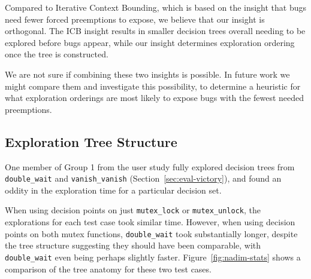 
Compared to Iterative Context Bounding\cite{chess}, which is based on the insight that bugs need fewer forced preemptions to expose, we believe that our insight is orthogonal. The ICB insight results in smaller decision trees overall needing to be explored before bugs appear, while our insight determines exploration ordering once the tree is constructed.

We are not sure if combining these two insights is possible. In future work we might compare them and investigate this possibility, to determine a heuristic for what exploration orderings are most likely to expose bugs with the fewest needed preemptions.

\subsection{Exploration Tree Structure}
\label{sec:future-nadim}

One member of Group 1 from the user study fully explored decision trees from \texttt{double\_wait} and \texttt{vanish\_vanish} (Section~\ref{sec:eval-victory}), and found an oddity in the exploration time for a particular decision set.

When using decision points on just \texttt{mutex\_lock} or \texttt{mutex\_unlock}, the explorations for each test case took similar time. However, when using decision points on both mutex functions, \texttt{double\_wait} took substantially longer, despite the tree structure suggesting they should have been comparable, with \texttt{double\_wait} even being perhaps slightly faster. Figure~\ref{fig:nadim-stats} shows a comparison of the tree anatomy for these two test cases.

